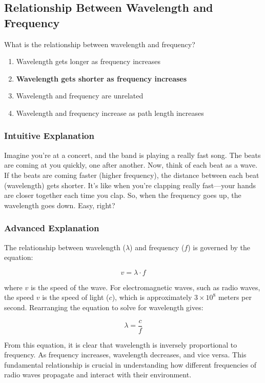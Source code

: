 \subsection{Relationship Between Wavelength and Frequency}
\label{T3B05}

\begin{tcolorbox}[colback=gray!10!white,colframe=black!75!black,title=T3B05]
What is the relationship between wavelength and frequency?
\begin{enumerate}[label=\Alph*)]
    \item Wavelength gets longer as frequency increases
    \item \textbf{Wavelength gets shorter as frequency increases}
    \item Wavelength and frequency are unrelated
    \item Wavelength and frequency increase as path length increases
\end{enumerate}
\end{tcolorbox}

\subsubsection{Intuitive Explanation}
Imagine you're at a concert, and the band is playing a really fast song. The beats are coming at you quickly, one after another. Now, think of each beat as a wave. If the beats are coming faster (higher frequency), the distance between each beat (wavelength) gets shorter. It's like when you're clapping really fast—your hands are closer together each time you clap. So, when the frequency goes up, the wavelength goes down. Easy, right?

\subsubsection{Advanced Explanation}
The relationship between wavelength ($\lambda$) and frequency ($f$) is governed by the equation:

\[
v = \lambda \cdot f
\]

where $v$ is the speed of the wave. For electromagnetic waves, such as radio waves, the speed $v$ is the speed of light ($c$), which is approximately $3 \times 10^8$ meters per second. Rearranging the equation to solve for wavelength gives:

\[
\lambda = \frac{c}{f}
\]

From this equation, it is clear that wavelength is inversely proportional to frequency. As frequency increases, wavelength decreases, and vice versa. This fundamental relationship is crucial in understanding how different frequencies of radio waves propagate and interact with their environment.

